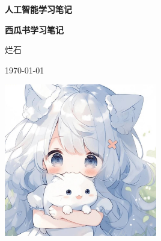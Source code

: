 \documentclass[a4paper,12pt,UTF8,fontset=none]{ctexart}
\begin{document}
\begin{titlepage}
    \centering
    \vspace*{\fill}
    {\LARGE\bfseries 人工智能学习笔记\par}
    \vspace{2cm}
    {\Huge\bfseries 西瓜书学习笔记\par}
    \vspace{2cm}
    {\Large 烂石\par}
    \vspace{1cm}
    {\large \today \par}
    \vspace{4cm}
    \includegraphics[width=0.5\textwidth]{static/images/logo.png}
    \vspace*{\fill}
    \thispagestyle{empty} %
    \newpage
\end{titlepage}



\end{document}
